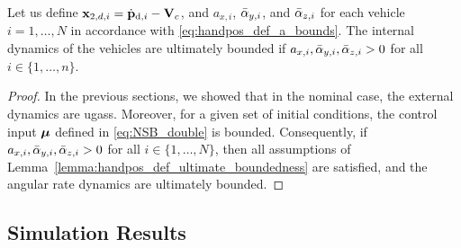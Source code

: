 \begin{prop}
    \label{prop:angular_velocities}
    Let us define $\mathbf{x}_{2, d, i} = \dot{\mathbf{p}}_{{\rm d}, i} - \mathbf{V}_c$, and $a_{x, i}$, $\Bar{\alpha}_{y, i}$, and $\Bar{\alpha}_{z, i}$ for each vehicle $i = 1, \ldots, N$ in accordance with \eqref{eq:handpos_def_a_bounds}.
    The internal dynamics of the vehicles are ultimately bounded if $a_{x, i}, \Bar{\alpha}_{y, i}, \Bar{\alpha}_{z, i} > 0$ for all $i \in \{1, \ldots, n\}$.
\end{prop}

\begin{proof}
    In the previous sections, we showed that in the nominal case, the external dynamics are \glspl{ugas}.
    Moreover, for a given set of initial conditions, the control input $\bm{\mu}$ defined in \eqref{eq:NSB_double} is bounded.
    Consequently, if $a_{x, i}, \Bar{\alpha}_{y, i}, \Bar{\alpha}_{z, i} > 0$ for all $i \in \{1, \ldots, N\}$, then all assumptions of Lemma~\ref{lemma:handpos_def_ultimate_boundedness} are satisfied, and the angular rate dynamics are ultimately bounded.
\end{proof}

\subsection{Simulation Results}\label{sec:simulation}

